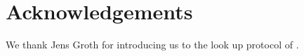 \documentclass[11pt]{article} %
\newcommand{\F}{\ensuremath{\mathbb F}\xspace}
\newcommand{\prv}{\ensuremath{\mathsf{\mathbf{P}}}\xspace}
\newcommand{\set}[1]{\ensuremath{\left\{#1\right\}}\xspace}
\newcommand{\polysofdeg}[1]{\ensuremath{\F_{< #1}[X]}\xspace}
\begin{document}
\section*{Acknowledgements} 
We thank Jens Groth for introducing us to the look up protocol of \cite{arya}.

% 
% 
% 


   
\end{document}
